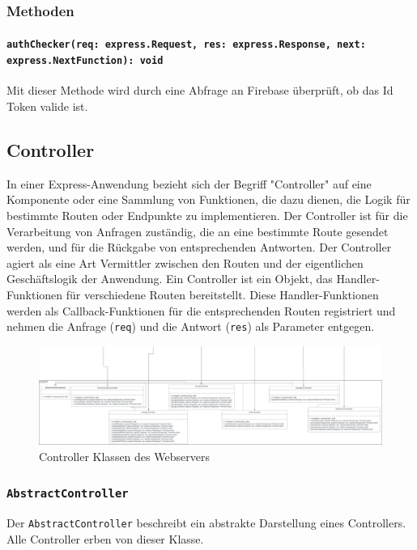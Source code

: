 \documentclass{entwurfsheft}
\begin{document}
\subsubsection*{Methoden}
\paragraph{\texttt{authChecker(req: express.Request, res: express.Response, next: express.NextFunction): void}}
Mit dieser Methode wird durch eine Abfrage an Firebase überprüft, ob das Id Token valide ist.

\newpage

\subsection{Controller}
In einer Express-Anwendung bezieht sich der Begriff "Controller" auf eine Komponente oder eine Sammlung von Funktionen, die dazu dienen, die Logik für bestimmte Routen oder Endpunkte zu implementieren.
Der Controller ist für die Verarbeitung von Anfragen zuständig, die an eine bestimmte Route gesendet werden, und für die Rückgabe von entsprechenden Antworten.
Der Controller agiert als eine Art Vermittler zwischen den Routen und der eigentlichen Geschäftslogik der Anwendung.
Ein Controller ist ein Objekt, das Handler-Funktionen für verschiedene Routen bereitstellt.
Diese Handler-Funktionen werden als Callback-Funktionen für die entsprechenden Routen registriert und nehmen die Anfrage (\texttt{req}) und die Antwort (\texttt{res}) als Parameter entgegen.



\begin{figure}[htp]
    \centering
    \includegraphics[width = 1\textwidth]{images/webserver/controller.pdf}
    \caption{Controller Klassen des Webservers}
    \label{fig:controller}
\end{figure}

\subsubsection{\texttt{AbstractController}}\label{sec:AbstractController}
Der \texttt{AbstractController} beschreibt ein abstrakte Darstellung eines Controllers. Alle Controller erben von dieser Klasse.
\end{document}
